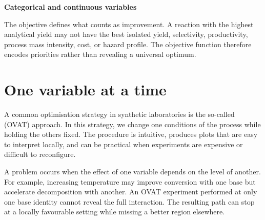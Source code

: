 \solution{6cm}
{ \centering
  \textbf{Categorical and continuous variables}
}

The objective defines what counts as improvement.
A reaction with the highest analytical yield may not have the best isolated yield, selectivity, productivity, process mass intensity, cost, or hazard profile.
The objective function therefore encodes priorities rather than revealing a universal optimum.

\section{One variable at a time}

A common optimisation strategy in synthetic laboratories is the so-called  (OVAT) approach.
In this strategy, we change one conditions of the process while holding the others fixed.
The procedure is intuitive, produces plots that are easy to interpret locally, and can be practical when experiments are expensive or difficult to reconfigure.

A problem occurs when the effect of one variable depends on the level of another.
For example, increasing temperature may improve conversion with one base but accelerate decomposition with another.
An OVAT experiment performed at only one base identity cannot reveal the full interaction.
The resulting path can stop at a locally favourable setting while missing a better region elsewhere.


